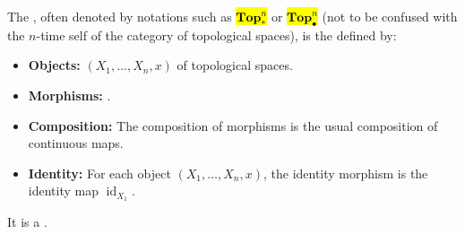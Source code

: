 \begin{definition} \label{definition:category_of_pointed_n_tuples_of_topological_spaces}
    The , often denoted by notations such as \hl{$\mathbf{Top}^n_*$} or \hl{$\mathbf{Top}^n_\bullet$} (not to be confused with the $n$-time self  of the category  of topological spaces), is the  defined by:
    \begin{itemize}
        \item \textbf{Objects:}  $(X_1, \dots, X_n, x)$ of topological spaces.
        \item \textbf{Morphisms:} .
        \item \textbf{Composition:} The composition of morphisms is the usual composition of continuous maps.
        \item \textbf{Identity:} For each object $(X_1, \dots, X_n, x)$, the identity morphism is the identity map $\operatorname{id}_{X_1}$.
    \end{itemize}
    It is a .
\end{definition}